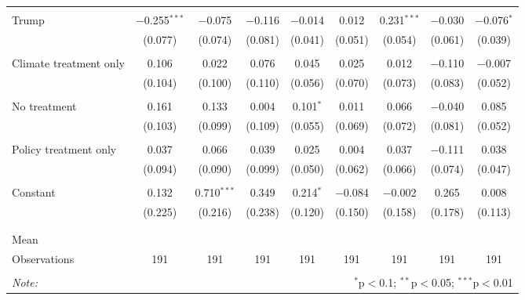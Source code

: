 \begin{tabular}{@{\extracolsep{5pt}}lcccccccc}
  & & & & & & & & \\ 
 Trump & $-$0.255$^{***}$ & $-$0.075 & $-$0.116 & $-$0.014 & 0.012 & 0.231$^{***}$ & $-$0.030 & $-$0.076$^{*}$ \\ 
  & (0.077) & (0.074) & (0.081) & (0.041) & (0.051) & (0.054) & (0.061) & (0.039) \\ 
  & & & & & & & & \\ 
 Climate treatment only & 0.106 & 0.022 & 0.076 & 0.045 & 0.025 & 0.012 & $-$0.110 & $-$0.007 \\ 
  & (0.104) & (0.100) & (0.110) & (0.056) & (0.070) & (0.073) & (0.083) & (0.052) \\ 
  & & & & & & & & \\ 
 No treatment & 0.161 & 0.133 & 0.004 & 0.101$^{*}$ & 0.011 & 0.066 & $-$0.040 & 0.085 \\ 
  & (0.103) & (0.099) & (0.109) & (0.055) & (0.069) & (0.072) & (0.081) & (0.052) \\ 
  & & & & & & & & \\ 
 Policy treatment only & 0.037 & 0.066 & 0.039 & 0.025 & 0.004 & 0.037 & $-$0.111 & 0.038 \\ 
  & (0.094) & (0.090) & (0.099) & (0.050) & (0.062) & (0.066) & (0.074) & (0.047) \\ 
  & & & & & & & & \\ 
 Constant & 0.132 & 0.710$^{***}$ & 0.349 & 0.214$^{*}$ & $-$0.084 & $-$0.002 & 0.265 & 0.008 \\ 
  & (0.225) & (0.216) & (0.238) & (0.120) & (0.150) & (0.158) & (0.178) & (0.113) \\ 
  & & & & & & & & \\ 
\hline \\[-1.8ex] 
Mean &  &  &  &  &  &  &  &  \\ 
Observations & 191 & 191 & 191 & 191 & 191 & 191 & 191 & 191 \\ 
\hline 
\hline \\[-1.8ex] 
\textit{Note:}  & \multicolumn{8}{r}{$^{*}$p$<$0.1; $^{**}$p$<$0.05; $^{***}$p$<$0.01} \\ 
\end{tabular} 
